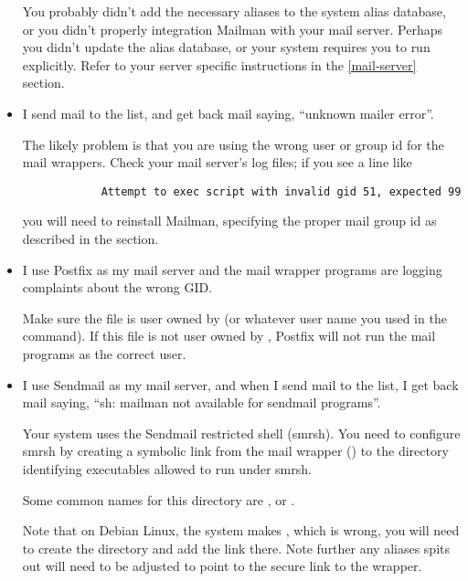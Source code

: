 \documentclass{howto}
\begin{document}
\begin{itemize}
       You probably didn't add the necessary aliases to the
      system alias database, or you didn't properly integration Mailman with
      your mail server.  Perhaps you didn't update the alias database, or your
      system requires you to run  explicitly.  Refer to
      your server specific instructions in the \ref{mail-server} section.

\item {} I send mail to the list, and get back mail saying,
      ``unknown mailer error''.

       The likely problem is that you are using the wrong
      user or group id for the mail wrappers.  Check your mail server's log
      files; if you see a line like

      \begin{verbatim}
            Attempt to exec script with invalid gid 51, expected 99
      \end{verbatim}

      you will need to reinstall Mailman, specifying the proper mail group id
      as described in the \label{building} section.

\item {} I use Postfix as my mail server and the mail wrapper
      programs are logging complaints about the wrong GID.

       Make sure the 
      file is user owned by  (or whatever user name you used
      in the  command).  If this file is not user owned by
      , Postfix will not run the mail programs as the correct
      user.

\item {} I use Sendmail as my mail server, and when I send mail
      to the list, I get back mail saying, ``sh: mailman not available for
      sendmail programs''.

       Your system uses the Sendmail restricted shell
      (smrsh). You need to configure smrsh by creating a symbolic link from
      the mail wrapper () to the directory
      identifying executables allowed to run under smrsh.

      Some common names for this directory are ,
       or .

      Note that on Debian Linux, the system makes ,
      which is wrong, you will need to create the directory
       and add the link there.  Note further any
      aliases  spits out will need to be adjusted to point
      to the secure link to the wrapper.


\end{itemize}
\end{document}
